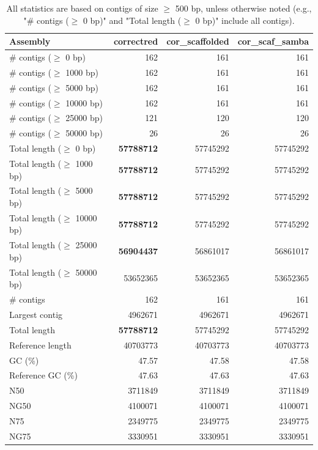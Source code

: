 \documentclass[12pt,a4paper]{article}
\begin{document}
\begin{table}[ht]
\begin{center}
\caption{All statistics are based on contigs of size $\geq$ 500 bp, unless otherwise noted (e.g., "\# contigs ($\geq$ 0 bp)" and "Total length ($\geq$ 0 bp)" include all contigs).}
\begin{tabular}{|l*{3}{|r}|}
\hline
Assembly & correctred & cor\_scaffolded & cor\_scaf\_samba \\ \hline
\# contigs ($\geq$ 0 bp) & 162 & 161 & 161 \\ \hline
\# contigs ($\geq$ 1000 bp) & 162 & 161 & 161 \\ \hline
\# contigs ($\geq$ 5000 bp) & 162 & 161 & 161 \\ \hline
\# contigs ($\geq$ 10000 bp) & 162 & 161 & 161 \\ \hline
\# contigs ($\geq$ 25000 bp) & 121 & 120 & 120 \\ \hline
\# contigs ($\geq$ 50000 bp) & 26 & 26 & 26 \\ \hline
Total length ($\geq$ 0 bp) & {\bf 57788712} & 57745292 & 57745292 \\ \hline
Total length ($\geq$ 1000 bp) & {\bf 57788712} & 57745292 & 57745292 \\ \hline
Total length ($\geq$ 5000 bp) & {\bf 57788712} & 57745292 & 57745292 \\ \hline
Total length ($\geq$ 10000 bp) & {\bf 57788712} & 57745292 & 57745292 \\ \hline
Total length ($\geq$ 25000 bp) & {\bf 56904437} & 56861017 & 56861017 \\ \hline
Total length ($\geq$ 50000 bp) & 53652365 & 53652365 & 53652365 \\ \hline
\# contigs & 162 & 161 & 161 \\ \hline
Largest contig & 4962671 & 4962671 & 4962671 \\ \hline
Total length & {\bf 57788712} & 57745292 & 57745292 \\ \hline
Reference length & 40703773 & 40703773 & 40703773 \\ \hline
GC (\%) & 47.57 & 47.58 & 47.58 \\ \hline
Reference GC (\%) & 47.63 & 47.63 & 47.63 \\ \hline
N50 & 3711849 & 3711849 & 3711849 \\ \hline
NG50 & 4100071 & 4100071 & 4100071 \\ \hline
N75 & 2349775 & 2349775 & 2349775 \\ \hline
NG75 & 3330951 & 3330951 & 3330951 \\ \hline

\end{tabular}
\end{center}
\end{table}
\end{document}
